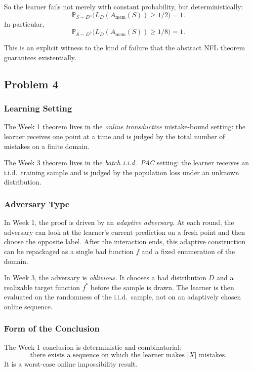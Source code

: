 \documentclass{article}
\theoremstyle{definition}
\theoremstyle{remark}
\newcommand{\PP}{\mathbb{P}}
\begin{document}
So the learner fails not merely with constant probability, but deterministically:
$$
\PP_{S\sim D^n}\bigl(L_D(A_{\mathrm{mem}}(S))\ge 1/2\bigr)=1.
$$
In particular,
$$
\PP_{S\sim D^n}\bigl(L_D(A_{\mathrm{mem}}(S))\ge 1/8\bigr)=1.
$$

This is an explicit witness to the kind of failure that the abstract NFL theorem guarantees existentially.

\subsection{Problem 4}

\subsubsection{Learning Setting}

The Week 1 theorem lives in the \emph{online transductive} mistake-bound setting: the learner receives one point at a time and is judged by the total number of mistakes on a finite domain.

The Week 3 theorem lives in the \emph{batch i.i.d.\ PAC} setting: the learner receives an i.i.d.\ training sample and is judged by the population loss under an unknown distribution.

\subsubsection{Adversary Type}

In Week 1, the proof is driven by an \emph{adaptive adversary}. At each round, the adversary can look at the learner's current prediction on a fresh point and then choose the opposite label. After the interaction ends, this adaptive construction can be repackaged as a single bad function $f$ and a fixed enumeration of the domain.

In Week 3, the adversary is \emph{oblivious}. It chooses a bad distribution $D$ and a realizable target function $f^*$ before the sample is drawn. The learner is then evaluated on the randomness of the i.i.d.\ sample, not on an adaptively chosen online sequence.

\subsubsection{Form of the Conclusion}

The Week 1 conclusion is deterministic and combinatorial:
$$
\text{there exists a sequence on which the learner makes } |X| \text{ mistakes.}
$$
It is a worst-case online impossibility result.
\end{document}
